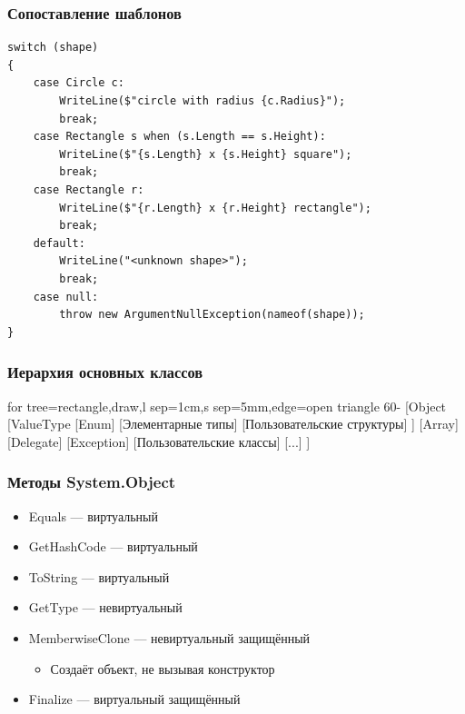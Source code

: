 \documentclass[xetex,mathserif,serif]{beamer}
\begin{document}
	\begin{frame}[fragile]
		\frametitle{Сопоставление шаблонов}
		\begin{small}
			\begin{verbatim}
switch (shape)
{
    case Circle c:
        WriteLine($"circle with radius {c.Radius}");
        break;
    case Rectangle s when (s.Length == s.Height):
        WriteLine($"{s.Length} x {s.Height} square");
        break;
    case Rectangle r:
        WriteLine($"{r.Length} x {r.Height} rectangle");
        break;
    default:
        WriteLine("<unknown shape>");
        break;
    case null:
        throw new ArgumentNullException(nameof(shape));
}
			\end{verbatim}
		\end{small}
\end{frame}

\begin{frame}
	\frametitle{Иерархия основных классов}
	\begin{tiny}
		\begin{forest}
			for tree={rectangle,draw,l sep=1cm,s sep=5mm,edge=open triangle 60-}
			[Object
				[ValueType
					[Enum]
					[Элементарные типы]
					[Пользовательские структуры]
				]
				[Array]
				[Delegate]
				[Exception]
				[Пользовательские классы]
				[...]
			]
		\end{forest}
	\end{tiny}
\end{frame}

\begin{frame}
	\frametitle{Методы System.Object}
	\begin{itemize}
		\item Equals --- виртуальный
		\item GetHashCode --- виртуальный
		\item ToString --- виртуальный
		\item GetType --- невиртуальный
		\item MemberwiseClone --- невиртуальный защищённый
		\begin{itemize}
			\item Создаёт объект, не вызывая конструктор
		\end{itemize}
		\item Finalize --- виртуальный защищённый
	\end{itemize}
\end{frame}
\end{document}
